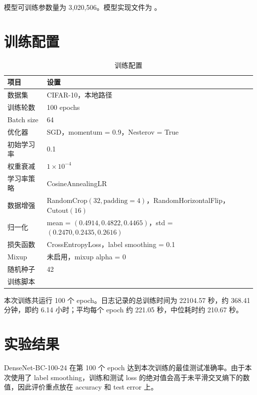 \documentclass[UTF8]{ctexart}
\begin{document}
模型可训练参数量为 3,020,506。模型实现文件为 。

\section{训练配置}

\begin{table}[H]
    \centering
    \caption{训练配置}
    \begin{tabularx}{\textwidth}{lY}
        \toprule
        项目 & 设置 \\
        \midrule
        数据集 & CIFAR-10，本地路径  \\
        训练轮数 & 100 epochs \\
        Batch size & 64 \\
        优化器 & SGD，momentum = 0.9，Nesterov = True \\
        初始学习率 & 0.1 \\
        权重衰减 & $1\times10^{-4}$ \\
        学习率策略 & CosineAnnealingLR \\
        数据增强 & RandomCrop$(32,\mathrm{padding}=4)$，RandomHorizontalFlip，Cutout$(16)$ \\
        归一化 & mean = $(0.4914, 0.4822, 0.4465)$，std = $(0.2470, 0.2435, 0.2616)$ \\
        损失函数 & CrossEntropyLoss，label smoothing = 0.1 \\
        Mixup & 未启用，mixup alpha = 0 \\
        随机种子 & 42 \\
        训练脚本 &  \\
        \bottomrule
    \end{tabularx}
\end{table}

本次训练共运行 100 个 epoch。日志记录的总训练时间为 22104.57 秒，约 368.41 分钟，即约
6.14 小时；平均每个 epoch 约 221.05 秒，中位耗时约 210.67 秒。

\section{实验结果}

DenseNet-BC-100-24 在第 100 个 epoch 达到本次训练的最佳测试准确率。由于本次使用了
label smoothing，训练和测试 loss 的绝对值会高于未平滑交叉熵下的数值，因此评价重点放在
accuracy 和 test error 上。
\end{document}
